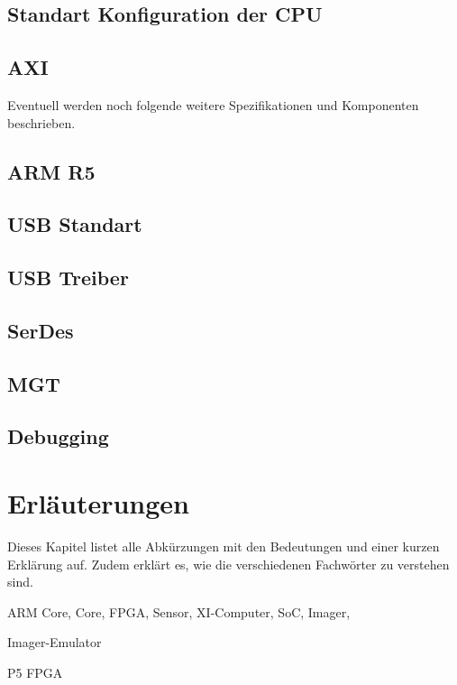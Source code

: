\documentclass{article}
\begin{document}
\subsection{Standart Konfiguration der CPU}
\subsection{AXI}

Eventuell werden noch folgende weitere Spezifikationen und Komponenten be\-schrieben.
\subsection{ARM R5}
\subsection{USB Standart}
\subsection{USB Treiber}
\subsection{SerDes}
\subsection{MGT}
\subsection{Debugging}

\section{Erläuterungen}
Dieses Kapitel listet alle Abkürzungen mit den Bedeutungen und einer kurzen Erklärung auf. Zudem erklärt es, wie die verschiedenen Fachwörter zu verstehen sind.

ARM Core,
Core,
FPGA,
Sensor,
XI-Computer,
SoC,
Imager,

Imager-Emulator

P5
FPGA
\end{document}

